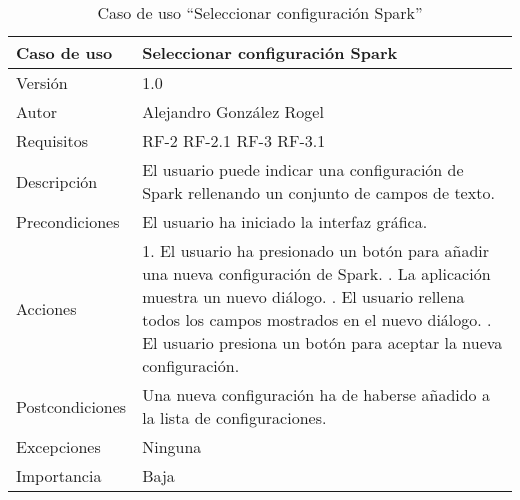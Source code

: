  
 \begin{table}
  \begin{center}
   \begin{tabular}{|>{} L{3cm} | L{9cm} |}
    \hline
    Caso de uso & Seleccionar configuración Spark\\
    \hline
    Versión & 1.0 \\
    \hline
    Autor & Alejandro González Rogel \\
    \hline
    Requisitos & RF-2\newline
    				 RF-2.1\newline
    				 RF-3\newline
    				 RF-3.1 \\
    \hline
    Descripción & El usuario puede indicar una configuración de Spark rellenando un conjunto de campos de texto. \\
    \hline
    Precondiciones & El usuario ha iniciado la interfaz gráfica.\\
    \hline
    Acciones & 1. El usuario ha presionado un botón para añadir una nueva configuración de Spark. . La aplicación muestra un nuevo diálogo. . El usuario rellena todos los campos mostrados en el nuevo diálogo. . El usuario presiona un botón para aceptar la nueva configuración.  \\
    \hline
    Postcondiciones & Una nueva configuración ha de haberse añadido a la lista de configuraciones. \\
    \hline
    Excepciones & Ninguna \\
    \hline
    Importancia & Baja \\
    \hline
   \end{tabular}
   \caption{Caso de uso ``Seleccionar configuración Spark''}
   \label{tabla:casoUso5}
  \end{center}
 \end{table}
 
